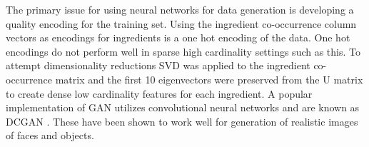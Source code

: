 \documentclass[conference]{IEEEtran}
\begin{document}
The primary issue for using neural networks for data generation
is developing a quality encoding for the training set. Using the ingredient co-occurrence
column vectors as encodings for ingredients is a one hot encoding of the data. One hot encodings
do not perform well in sparse high cardinality settings such as this. To attempt dimensionality
reductions SVD was applied to the ingredient co-occurrence matrix and the first 10 eigenvectors
were preserved from the U matrix to create dense low cardinality features for each ingredient.
A popular implementation of GAN utilizes convolutional neural networks and are known as DCGAN
\cite{Radford16}.
These have been shown to work well for generation of realistic images of faces and objects.


\end{document}
